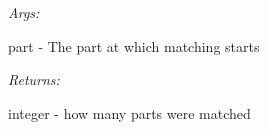 \documentclass[letterpaper,10pt,english]{sphinxmanual}
\begin{document}
\begin{fulllineitems}
\begin{fulllineitems}
\begin{DUlineblock}{0em}
\item[] \emph{Args:}
\item[]
\begin{DUlineblock}{\DUlineblockindent}
\item[] part - The part at which matching starts
\end{DUlineblock}
\end{DUlineblock}

\begin{DUlineblock}{0em}
\item[] \emph{Returns:}
\item[]
\begin{DUlineblock}{\DUlineblockindent}
\item[] integer - how many parts were matched
\end{DUlineblock}
\end{DUlineblock}

\end{fulllineitems}


\end{fulllineitems}

\end{document}
